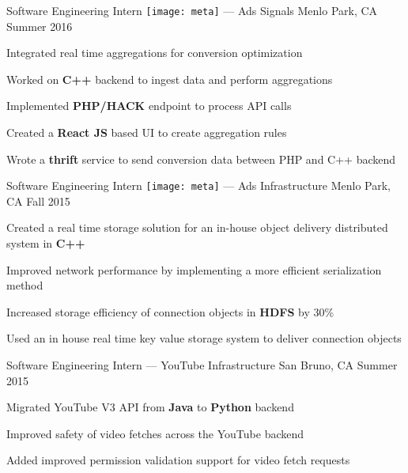 \begin{cventries}
\vspace{\myspacing}


\cventry
{Software Engineering Intern} %
{{\texttt{[image: meta]}} --- Ads Signals} %
{Menlo Park, CA} %
{Summer 2016} %
{%
  \begin{cvitems}
    \item {Integrated real time aggregations for conversion optimization}
    \item {Worked on \textbf{C++} backend to ingest data and perform aggregations}
    \item {Implemented \textbf{PHP/HACK} endpoint to process API calls}
    \item {Created a \textbf{React JS} based UI to create aggregation rules}
    \item {Wrote a \textbf{thrift} service to send conversion data between PHP and C++ backend}
  \end{cvitems}
}

\vspace{\myspacing}


\cventry
{Software Engineering Intern} %
{{\texttt{[image: meta]}} --- Ads Infrastructure} %
{Menlo Park, CA} %
{Fall 2015} %
{%
  \begin{cvitems}
    \item {Created a real time storage solution for an in-house object delivery distributed system in \textbf{C++}}
    \item {Improved network performance by implementing a more efficient serialization method}
    \item {Increased storage efficiency of connection objects in \textbf{HDFS} by 30\%}
    \item {Used an in house real time key value storage system to deliver connection objects}
  \end{cvitems}
}

\vspace{\myspacing}


\cventry
{Software Engineering Intern} %
{{\google} --- YouTube Infrastructure}%
{San Bruno, CA} %
{Summer 2015} %
{%
  \begin{cvitems}
    \item {Migrated YouTube V3 API from \textbf{Java} to \textbf{Python} backend}
    \item {Improved safety of video fetches across the YouTube backend}
    \item {Added improved permission validation support for video fetch requests}
  \end{cvitems} 
}


\end{cventries}
